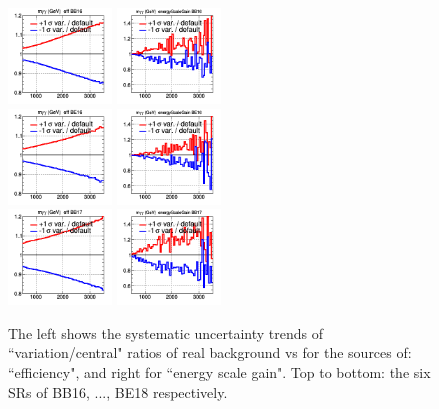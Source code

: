 
\begin{figure}[!htbp]
\caption{The left shows the systematic uncertainty trends of ``variation/central" ratios of real \gmgm background vs \mgg for the sources of: ``efficiency", and right for ``energy scale gain". Top to bottom: the six SRs of BB16, ..., BE18 respectively.}
\centering
\includegraphics[width=0.24\linewidth, height=1in]{fig/spectra__eff_BB16_ADDGRW.png}
\includegraphics[width=0.24\linewidth, height=1in]{fig/spectra__energyScaleGain_BB16_ADDGRW.png}\\
\includegraphics[width=0.24\linewidth, height=1in]{fig/spectra__eff_BE16_ADDGRW.png}
\includegraphics[width=0.24\linewidth, height=1in]{fig/spectra__energyScaleGain_BE16_ADDGRW.png}\\
\includegraphics[width=0.24\linewidth, height=1in]{fig/spectra__eff_BB17_ADDGRW.png}
\includegraphics[width=0.24\linewidth, height=1in]{fig/spectra__energyScaleGain_BB17_ADDGRW.png}\\

\end{figure}
